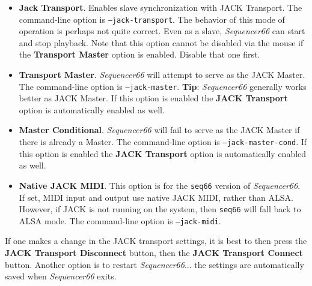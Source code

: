    \begin{itemize}
      \item \textbf{Jack Transport}.
         Enables slave synchronization with JACK Transport.
         The command-line option is \texttt{--jack-transport}.
         The behavior of this mode of operation is perhaps not quite
         correct.  Even as a slave, \textsl{Sequencer66} can start and
         stop playback.
         Note that this option cannot be disabled via the mouse if the
         \textbf{Transport Master} option is enabled.  Disable that one first.
      \item \textbf{Transport Master}.
         \textsl{Sequencer66} will attempt to serve as the JACK Master.
         The command-line option is \texttt{--jack-master}.
         \textbf{Tip}:
         \textsl{Sequencer66} generally works better as JACK Master.
         If this option is enabled the \textbf{JACK Transport} option is
         automatically enabled as well.
      \item \textbf{Master Conditional}.
         \textsl{Sequencer66} will fail to serve as the JACK Master if there is
         already a Master.
         The command-line option is \texttt{--jack-master-cond}.
         If this option is enabled the \textbf{JACK Transport} option is
         automatically enabled as well.
      \item \textbf{Native JACK MIDI}.
         This option is for the \texttt{seq66} version of
         \textsl{Sequencer66}.
         If set, MIDI input and output use native JACK MIDI,
         rather than ALSA.  However, if JACK is not running on the
         system, then \texttt{seq66} will fall back to ALSA mode.
         The command-line option is \texttt{--jack-midi}.
   \end{itemize}


   If one makes a change in the JACK transport settings, it is best to
   then press the \textbf{JACK Transport Disconnect} button, then the
   \textbf{JACK Transport Connect} button.  Another option is to restart
   \textsl{Sequencer66}... the settings are automatically saved when
   \textsl{Sequencer66} exits.

